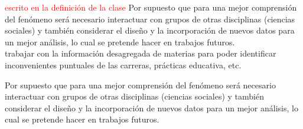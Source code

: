 \textcolor{red}{escrito en la definición de la clase}
Por supuesto que para una mejor comprensión del fenómeno será necesario interactuar con grupos de otras disciplinas (ciencias sociales) y también considerar el diseño y  la incorporación de nuevos datos para un mejor análisis, lo cual se pretende hacer en trabajos futuros.\\
trabajar con la información desagregada de materias para poder identificar inconvenientes puntuales de las carreras, prácticas educativa, etc.

Por supuesto que para una mejor comprensión del fenómeno será necesario interactuar con grupos de otras disciplinas (ciencias sociales) y también considerar el diseño y  la incorporación de nuevos datos para un mejor análisis, lo cual se pretende hacer en trabajos futuros.
